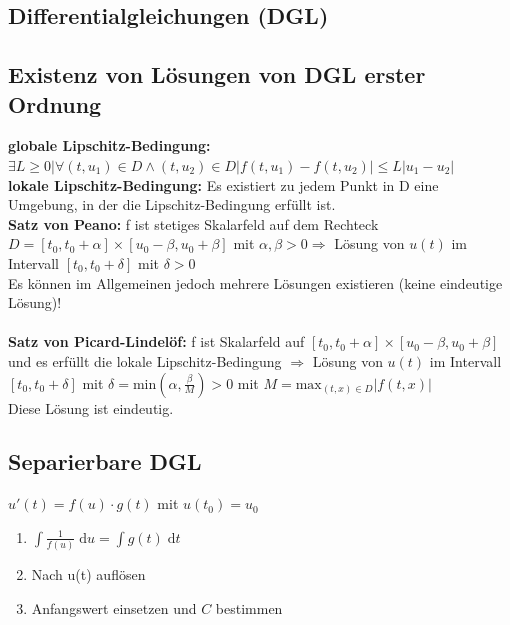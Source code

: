 \documentclass[6pt,a4paper]{scrartcl}
\newcommand{\abs}[1]{\ensuremath{\left\vert#1\right\vert}} 										%
\newcommand{\diff}{\ensuremath{\;\mathrm d}}									%
\begin{document}
\begin{multicols*}{4}
\section{Differentialgleichungen (DGL)}
\subsection{Existenz von Lösungen von DGL erster Ordnung}
\textbf{globale Lipschitz-Bedingung:} $\exists L \geq 0 | \forall (t, u_1) \in D \wedge (t, u_2) \in D \abs{f(t,u_1)-f(t,u_2)} \leq L\abs{u_1-u_2}$ \\
\textbf{lokale Lipschitz-Bedingung:} Es existiert zu jedem Punkt in D eine Umgebung, in der die Lipschitz-Bedingung erfüllt ist.\\
\textbf{Satz von Peano:} f ist stetiges Skalarfeld auf dem Rechteck $D = [t_0, t_0 + \alpha] \times [u_0-\beta , u_0+\beta]$ mit $\alpha, \beta > 0 \Rightarrow$ Lösung von $u(t)$ im Intervall $[t_0, t_0+\delta]$ mit $\delta > 0$\\
Es können im Allgemeinen jedoch mehrere Lösungen existieren (keine eindeutige Lösung)!\\ \\
\textbf{Satz von Picard-Lindelöf:} f ist Skalarfeld auf $[t_0, t_0 + \alpha] \times [u_0-\beta , u_0+\beta]$ und es erfüllt die lokale Lipschitz-Bedingung $\Rightarrow$ Lösung von $u(t)$ im Intervall $[t_0, t_0+\delta]$ mit $\delta = \text{min}(\alpha, \frac{\beta}{M}) > 0$ mit $M = \text{max}_{(t,x)\in D}\abs{f(t,x)}$\\
Diese Lösung ist eindeutig.

\subsection{Separierbare DGL}\label{sec:sep-dgl}
$\boxed{u'(t) = f(u) \cdot g(t)}$ mit $u(t_0) = u_0$\\
\begin{enumerate}
	\item $\int \frac{1}{f(u)} \diff u = \int g(t) \diff t$
	\item Nach u(t) auflösen
	\item Anfangswert einsetzen und $C$ bestimmen
\end{enumerate}

\iffalse

\end{multicols*}
\end{document}
